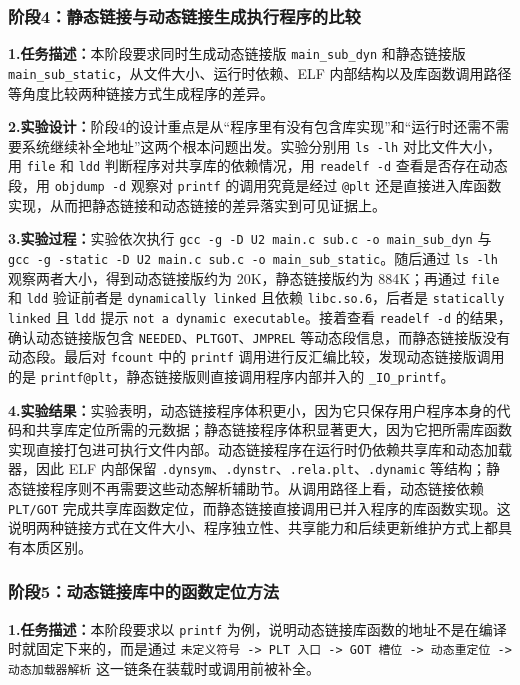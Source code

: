 \documentclass[supercite]{Experimental_Report}
\theoremstyle{definition}
\begin{document}
\subsubsection{阶段4：静态链接与动态链接生成执行程序的比较}
\noindent\textbf{1.任务描述：}本阶段要求同时生成动态链接版 \texttt{main\_sub\_dyn} 和静态链接版 \texttt{main\_sub\_static}，从文件大小、运行时依赖、ELF 内部结构以及库函数调用路径等角度比较两种链接方式生成程序的差异。

\noindent\textbf{2.实验设计：}阶段4的设计重点是从“程序里有没有包含库实现”和“运行时还需不需要系统继续补全地址”这两个根本问题出发。实验分别用 \texttt{ls -lh} 对比文件大小，用 \texttt{file} 和 \texttt{ldd} 判断程序对共享库的依赖情况，用 \texttt{readelf -d} 查看是否存在动态段，用 \texttt{objdump -d} 观察对 \texttt{printf} 的调用究竟是经过 \texttt{@plt} 还是直接进入库函数实现，从而把静态链接和动态链接的差异落实到可见证据上。

\noindent\textbf{3.实验过程：}实验依次执行 \texttt{gcc -g -D U2 main.c sub.c -o main\_sub\_dyn} 与 \texttt{gcc -g -static -D U2 main.c sub.c -o main\_sub\_static}。随后通过 \texttt{ls -lh} 观察两者大小，得到动态链接版约为 20K，静态链接版约为 884K；再通过 \texttt{file} 和 \texttt{ldd} 验证前者是 \texttt{dynamically linked} 且依赖 \texttt{libc.so.6}，后者是 \texttt{statically linked} 且 \texttt{ldd} 提示 \texttt{not a dynamic executable}。接着查看 \texttt{readelf -d} 的结果，确认动态链接版包含 \texttt{NEEDED}、\texttt{PLTGOT}、\texttt{JMPREL} 等动态段信息，而静态链接版没有动态段。最后对 \texttt{fcount} 中的 \texttt{printf} 调用进行反汇编比较，发现动态链接版调用的是 \texttt{printf@plt}，静态链接版则直接调用程序内部并入的 \texttt{\_IO\_printf}。

\noindent\textbf{4.实验结果：}实验表明，动态链接程序体积更小，因为它只保存用户程序本身的代码和共享库定位所需的元数据；静态链接程序体积显著更大，因为它把所需库函数实现直接打包进可执行文件内部。动态链接程序在运行时仍依赖共享库和动态加载器，因此 ELF 内部保留 \texttt{.dynsym}、\texttt{.dynstr}、\texttt{.rela.plt}、\texttt{.dynamic} 等结构；静态链接程序则不再需要这些动态解析辅助节。从调用路径上看，动态链接依赖 \texttt{PLT/GOT} 完成共享库函数定位，而静态链接直接调用已并入程序的库函数实现。这说明两种链接方式在文件大小、程序独立性、共享能力和后续更新维护方式上都具有本质区别。

\subsubsection{阶段5：动态链接库中的函数定位方法}
\noindent\textbf{1.任务描述：}本阶段要求以 \texttt{printf} 为例，说明动态链接库函数的地址不是在编译时就固定下来的，而是通过 \texttt{未定义符号 -> PLT 入口 -> GOT 槽位 -> 动态重定位 -> 动态加载器解析} 这一链条在装载时或调用前被补全。
\end{document}
